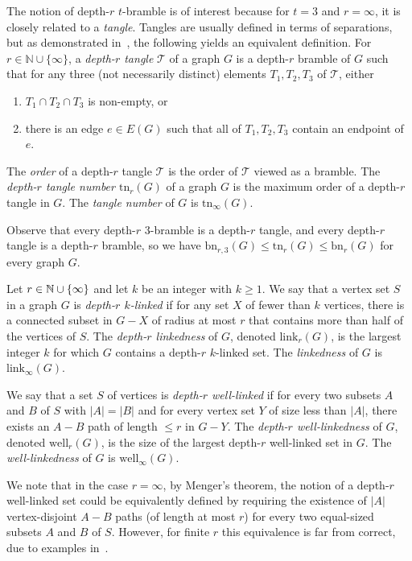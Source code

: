\documentclass[final]{dmtcs-episciences}
\theoremstyle{definition}
\theoremstyle{remark}
\newcommand{\dep}{depth}
\newcommand{\tangle}{\ensuremath{\mathrm{tn}}}
\newcommand{\bn}{\ensuremath{\mathrm{bn}}}
\newcommand{\link}{\ensuremath{\mathrm{link}}}
\newcommand{\WL}{\ensuremath{\mathrm{well}}}
\renewcommand{\leq}{\leqslant}
\renewcommand{\geq}{\geqslant}
\DeclarePairedDelimiter\set{\{}{\}}
\begin{document}
The notion of \dep-$r$ $t$-bramble is of interest because for $t=3$ and $r=\infty$, it is closely related to a \emph{tangle}. Tangles are usually defined in terms of separations, but as demonstrated in~\cite{Reed}, the following yields an equivalent definition.
For $r\in \mathbb{N}\cup \{\infty\}$, a \emph{\dep-$r$ tangle} $\mathcal{T}$ of a graph $G$ is a \dep-$r$ bramble of $G$ such that for any three (not necessarily distinct) elements $T_1,T_2,T_3$ of $\mathcal{T}$, either
\begin{enumerate}[label={(\roman*)}]
\item $T_1\cap T_2 \cap T_3$ is non-empty, or
\item there is an edge $e\in E(G)$ such that all of $T_1, T_2, T_3$ contain an endpoint of $e$. 
\end{enumerate}
The \emph{order} of a \dep-$r$ tangle $\mathcal{T}$ is the order of $\mathcal{T}$ viewed as a bramble.  
The \emph{\dep-$r$ tangle number $\tangle_r(G)$} of a graph $G$ is the maximum order of a \dep-$r$ tangle in $G$.
The \emph{tangle number} of $G$ is $\tangle_{\infty}(G)$.


Observe that every \dep-$r$ $3$-bramble is a \dep-$r$ tangle, and every \dep-$r$ tangle is a \dep-$r$ bramble, so we have $\bn_{r,3}(G) \leq \tangle_r(G) \leq \bn_r(G)$ for every graph $G$. 



Let $r\in\mathbb{N}\cup\set{\infty}$ and let $k$ be an integer with $k\geq 1$. 
We say that a vertex set $S$ in a graph $G$ is \emph{\dep-$r$ $k$-linked} if for any set $X$ of fewer than $k$ vertices, there is a connected subset in $G-X$ of radius at most $r$ that contains more than half of the vertices of $S$. 
The \emph{\dep-$r$ linkedness} of $G$, denoted $\link_r(G)$, is the largest integer $k$ for which $G$ contains a \dep-$r$ $k$-linked set. The \emph{linkedness} of $G$ is $\link_{\infty}(G)$.

We say that a set $S$ of vertices is \emph{\dep-$r$ well-linked} if for every two subsets $A$ and $B$ of $S$ with $|A|=|B|$ and for every vertex set $Y$ of size less than $|A|$, there exists an $A-B$ path of length $\leq r$ in $G-Y$.
The \emph{\dep-$r$ well-linkedness} of $G$, denoted $\WL_r(G)$, is the size of the largest \dep-$r$ well-linked set in $G$.
The \emph{well-linkedness} of $G$ is $\WL_{\infty}(G)$.

We note that in the case $r=\infty$, by Menger's theorem, the notion of a \dep-$r$ well-linked set could be equivalently defined by requiring the existence of $|A|$ vertex-disjoint $A-B$ paths (of length at most $r$) for every two equal-sized subsets $A$ and $B$ of $S$. However, for finite $r$ this equivalence is far from correct, due to examples in~\cite{LNP1978}.
\end{document}

